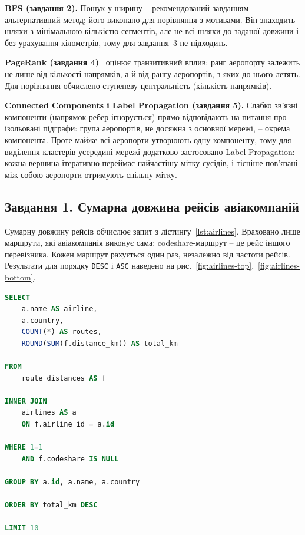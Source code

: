 \documentclass{iasa-lab}
\begin{document}
\textbf{BFS (завдання 2).} Пошук у ширину -- рекомендований завданням альтернативний метод; його виконано для порівняння з мотивами. Він знаходить шляхи з мінімальною кількістю сегментів, але не всі шляхи до заданої довжини і без урахування кілометрів, тому для завдання~3 не підходить.

\textbf{PageRank (завдання 4)}~\cite{needham2019} оцінює транзитивний вплив: ранг аеропорту залежить не лише від кількості напрямків, а й від рангу аеропортів, з яких до нього летять. Для порівняння обчислено ступеневу центральність (кількість напрямків).

\textbf{Connected Components і Label Propagation (завдання 5).} Слабко зв'язні компоненти (напрямок ребер ігнорується) прямо відповідають на питання про ізольовані підграфи: група аеропортів, не досяжна з основної мережі, -- окрема компонента. Проте майже всі аеропорти утворюють одну компоненту, тому для виділення кластерів усередині мережі додатково застосовано Label Propagation: кожна вершина ітеративно переймає найчастішу мітку сусідів, і тісніше пов'язані між собою аеропорти отримують спільну мітку.

\subsection{Завдання 1. Сумарна довжина рейсів авіакомпаній}

Сумарну довжину рейсів обчислює запит з лістингу~\ref{lst:airlines}. Враховано лише маршрути, які авіакомпанія виконує сама: codeshare-маршрут -- це рейс іншого перевізника. Кожен маршрут рахується один раз, незалежно від частоти рейсів. Результати для порядку \texttt{DESC} і \texttt{ASC} наведено на рис.~\ref{fig:airlines-top},~\ref{fig:airlines-bottom}.

\noindent\begin{minipage}{\linewidth}
\begin{lstlisting}[language=SQL, caption={Сумарна довжина маршрутів авіакомпаній}, label={lst:airlines}]
SELECT
    a.name AS airline,
    a.country,
    COUNT(*) AS routes,
    ROUND(SUM(f.distance_km)) AS total_km

FROM
    route_distances AS f

INNER JOIN
    airlines AS a
    ON f.airline_id = a.id

WHERE 1=1
    AND f.codeshare IS NULL

GROUP BY a.id, a.name, a.country

ORDER BY total_km DESC

LIMIT 10
\end{lstlisting}
\end{minipage}
\medskip
\end{document}
